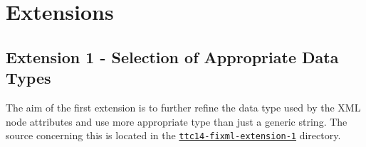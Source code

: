 
\section{Extensions}
\label{sec:Extensions}

\subsection{Extension 1 - Selection of Appropriate Data Types}
\label{sec:Extension1}

The aim of the first extension is to further refine the data type used by the XML node attributes and use more appropriate type than just a generic string.
The source concerning this is located in the \href{https://github.com/fikovnik/ttc14-fixml-sigma/tree/master/ttc14-fixml-extension-1}{\texttt{ttc14-fixml-extension-1}} directory.

\bigskip

